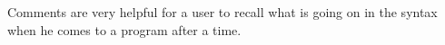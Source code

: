 \documentclass{article} %
\begin{document}
Comments are very helpful for a user to recall what is going on in the syntax when he comes to a program after a time.
\end{document}
